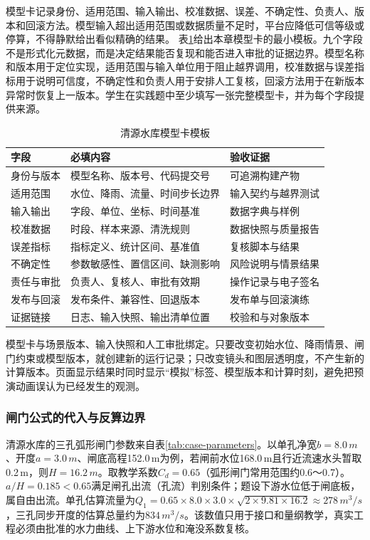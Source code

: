 模型卡记录身份、适用范围、输入输出、校准数据、误差、不确定性、负责人、版本和回滚方法。模型输入超出适用范围或数据质量不足时，平台应降低可信等级或停算，不得静默给出看似精确的结果。
表\ref{tab:ch08-model-card-template}给出本章模型卡的最小模板。九个字段不是形式化元数据，而是决定结果能否复现和能否进入审批的证据边界。模型名称和版本用于定位实现，适用范围与输入单位用于阻止越界调用，校准数据与误差指标用于说明可信度，不确定性和负责人用于安排人工复核，回滚方法用于在新版本异常时恢复上一版本。学生在实践题中至少填写一张完整模型卡，并为每个字段提供来源。
\begin{table}[htbp]
\centering
\caption{清源水库模型卡模板}
\label{tab:ch08-model-card-template}
\begin{tabular}{p{2.7cm}p{5.0cm}p{4.5cm}}
\toprule
字段 & 必填内容 & 验收证据 \\
\midrule
身份与版本 & 模型名称、版本号、代码提交号 & 可追溯构建产物 \\
适用范围 & 水位、降雨、流量、时间步长边界 & 输入契约与越界测试 \\
输入输出 & 字段、单位、坐标、时间基准 & 数据字典与样例 \\
校准数据 & 时段、样本来源、清洗规则 & 数据快照与质量报告 \\
误差指标 & 指标定义、统计区间、基准值 & 复核脚本与结果 \\
不确定性 & 参数敏感性、置信区间、缺测影响 & 风险说明与情景结果 \\
责任与审批 & 负责人、复核人、审批有效期 & 操作记录与电子签名 \\
发布与回滚 & 发布条件、兼容性、回退版本 & 发布单与回滚演练 \\
证据链接 & 日志、输入快照、输出清单位置 & 校验和与对象版本 \\
\bottomrule
\end{tabular}
\end{table}
模型卡与场景版本、输入快照和人工审批绑定。只要改变初始水位、降雨情景、闸门约束或模型版本，就创建新的运行记录；只改变镜头和图层透明度，不产生新的计算版本。页面显示结果时同时显示“模拟”标签、模型版本和计算时刻，避免把预演动画误认为已经发生的观测。

\subsubsection{闸门公式的代入与反算边界}
清源水库的三孔弧形闸门参数来自表\ref{tab:case-parameters}。以单孔净宽$b=8.0\,m$、开度$a=3.0\,m$、闸底高程152.0\,m为例，若闸前水位168.0\,m且行近流速水头暂取0.2\,m，则$H=16.2\,m$。取教学系数$C_d=0.65$（弧形闸门常用范围约0.6～0.7）。$a/H=0.185<0.65$满足闸孔出流（孔流）判别条件；题设下游水位低于闸底板，属自由出流。单孔估算流量为$Q_1=0.65\times8.0\times3.0\times\sqrt{2\times9.81\times16.2}\approx278\,m^3/s$，三孔同步开度的估算总量约为$834\,m^3/s$。该数值只用于接口和量纲教学，真实工程必须由批准的水力曲线、上下游水位和淹没系数复核。


